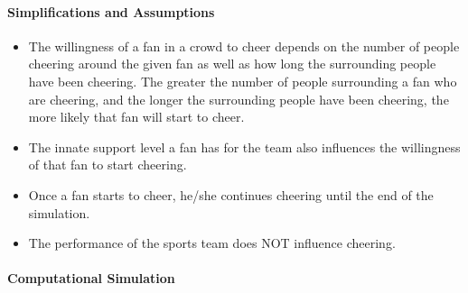 \documentclass[oneside,12pt]{report}
\begin{document}
\paragraph{Simplifications and Assumptions}
	\begin{itemize}
	\item The willingness of a fan in a crowd to cheer depends on the number of people cheering around the given fan as well as how long the surrounding people have been cheering. The greater the number of people surrounding a fan who are cheering, and the longer the surrounding people have been cheering, the more likely that fan will start to cheer.
	\item The innate support level a fan has for the team also influences the willingness of that fan to start cheering.
	\item Once a fan starts to cheer, he/she continues cheering until the end of the simulation.
	\item The performance of the sports team does NOT influence cheering.
	\end{itemize}

%

\paragraph {Computational Simulation}
\end{document}
